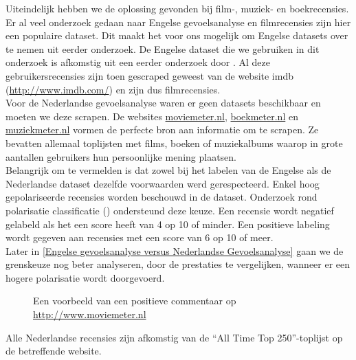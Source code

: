 Uiteindelijk hebben we de oplossing gevonden bij film-, muziek- en boekrecensies. Er al veel onderzoek gedaan naar Engelse gevoelsanalyse en filmrecensies zijn hier een populaire dataset. Dit maakt het voor ons mogelijk om Engelse datasets over te nemen uit eerder onderzoek. De Engelse dataset die we gebruiken in dit onderzoek is afkomstig uit een eerder onderzoek door \cite{maas-EtAl:2011:ACL-HLT2011}. Al deze gebruikersrecensies zijn toen gescraped geweest van de website imdb (\url{http://www.imdb.com/}) en zijn dus filmrecensies.\\
Voor de Nederlandse gevoelsanalyse waren er geen datasets beschikbaar en moeten we deze scrapen. De websites \url{moviemeter.nl}, \url{boekmeter.nl} en \url{muziekmeter.nl} vormen de perfecte bron aan informatie om te scrapen. Ze bevatten allemaal toplijsten met films, boeken of muziekalbums waarop in grote aantallen gebruikers hun persoonlijke mening plaatsen.\\

Belangrijk om te vermelden is dat zowel bij het labelen van de Engelse als de Nederlandse dataset dezelfde voorwaarden werd gerespecteerd. Enkel hoog gepolariseerde recensies worden beschouwd in de dataset. Onderzoek rond polarisatie classificatie (\cite{maas-EtAl:2011:ACL-HLT2011}) ondersteund deze keuze. Een recensie wordt negatief gelabeld als het een score heeft van 4 op 10 of minder. Een positieve labeling wordt gegeven aan recensies met een score van 6 op 10 of meer.\\

Later in \ref{Engelse gevoelsanalyse versus Nederlandse Gevoelsanalyse} gaan we de grenskeuze  nog beter analyseren, door de prestaties te vergelijken, wanneer er een hogere polarisatie wordt doorgevoerd.

\begin{figure}[h]%
    \centering
    \caption{Een voorbeeld van een positieve commentaar op \url{http://www.moviemeter.nl}}%
\end{figure}

Alle Nederlandse recensies zijn afkomstig van de ``All Time Top 250''-toplijst op de betreffende website.

